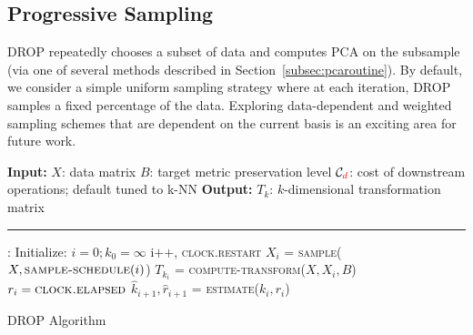 \subsection{Progressive Sampling}
\label{subsec:psample}
DROP repeatedly chooses a subset of data and computes PCA on the subsample (via one of several methods described in Section~\ref{subsec:pcaroutine}).
By default, we consider a simple uniform sampling strategy where at each iteration, DROP samples a fixed percentage of the data.
Exploring data-dependent and weighted sampling schemes that are dependent on the current basis is an exciting area for future work. 


\begin{algorithm}[t!]
\begin{algorithmic}[1]
\small
\Statex \textbf{Input:}  
\Statex $X$: data matrix
\Statex $B$: target metric preservation level
\Statex $\mathcal{C}_{\color{red}d}$: cost of downstream operations; default tuned to k-NN
\Statex
\Statex \textbf{Output:}   
\Statex $T_k$: $k$-dimensional transformation matrix
\Statex
\Statex \hrule
{}:
	\State Initialize: $i = 0; k_0 = \infty$ 
	\Do
		\State i$\texttt{++}$, \textsc{clock.restart}
		\State $X_i$ = \textsc{sample}($X, \textsc{sample-schedule}(i)$) \label{eq:sample}
			\Comment{\S~\ref{subsec:psample}}
		\State $T_{k_i}$ = \textsc{compute-transform}($X, X_i,  B$) \label{eq:evaluate}
			\Comment{\S~\ref{subsec:teval}}
		\State $r_i = \textsc{clock.elapsed}$	
		\State $\hat{k}_{i+1}, \hat{r}_{i+1} $ = \textsc{estimate}($k_i, r_i$) \label{eq:estimate}
			\Comment{\S~\ref{subsec:pest}}
	 \label{eq:optimize}
		\Comment{\S~\ref{subsec:opt}}
	\\
\EndFunction
\end{algorithmic}
\caption{DROP Algorithm}
\label{alg:DROP}
\end{algorithm}



